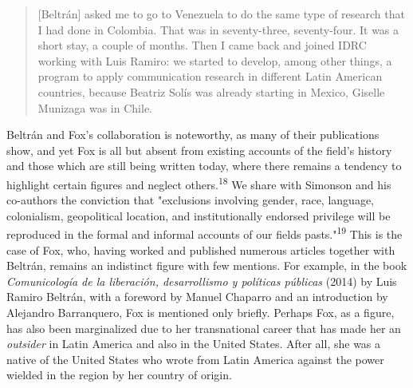 \documentclass{tufte-handout}
\begin{document}
\begin{quote}
{[}Beltrán{]} asked me to go to Venezuela to do the same type of
research that I had done in Colombia. That was in seventy-three,
seventy-four. It was a short stay, a couple of months. Then I came back
and joined IDRC working with Luis Ramiro: we started to develop, among
other things, a program to apply communication research in different
Latin American countries, because Beatriz Solís was already starting in
Mexico, Giselle Munizaga was in Chile.
\end{quote}

\noindent Beltrán and Fox's collaboration is noteworthy, as many of their
publications show, and yet Fox is all but absent from existing accounts
of the field's history and those which are still being written today,
where there remains a tendency to highlight certain figures and neglect
others.\textsuperscript{18} We share with Simonson and his co-authors the conviction
that "exclusions involving gender, race, language, colonialism,
geopolitical location, and institutionally endorsed privilege will be
reproduced in the formal and informal accounts of our
fields\textquotesingle{} pasts."\textsuperscript{19} This is the case of Fox, who, having worked and published numerous
articles together with Beltrán, remains an indistinct figure with few
mentions. For example, in the book \emph{Comunicología de la liberación,
desarrollismo y políticas públicas} (2014) by Luis Ramiro Beltrán, with
a foreword by Manuel Chaparro and an introduction by Alejandro
Barranquero, Fox is mentioned only briefly. Perhaps Fox, as a figure,
has also been marginalized due to her transnational career that has made
her an \emph{outsider} in Latin America and also in the United States.
After all, she was a native of the United States who wrote from Latin
America against the power wielded in the region by her country of
origin.
\end{document}
